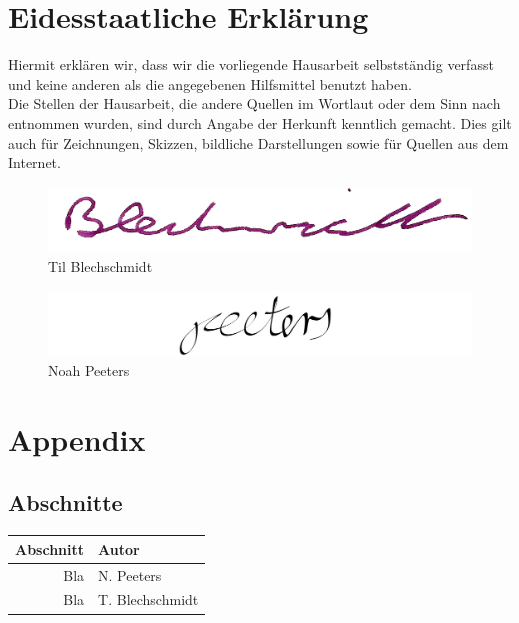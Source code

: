 \documentclass[a4paper]{article}
\begin{document}
    \clearpage
    \section{Eidesstaatliche Erklärung}
        Hiermit erklären wir, dass wir die vorliegende Hausarbeit selbstständig verfasst und keine anderen als die angegebenen Hilfsmittel benutzt haben.\\
        Die Stellen der Hausarbeit, die andere Quellen im Wortlaut oder dem Sinn nach entnommen wurden, sind durch Angabe der Herkunft kenntlich gemacht. Dies gilt auch für Zeichnungen, Skizzen, bildliche Darstellungen sowie für Quellen aus dem Internet.
        
        
        \begin{figure}[H]
            \centering
            \begin{minipage}{.5\textwidth}
                \centering
                \includegraphics[width=\textwidth]{assets/signature_tilb.png}
                Til Blechschmidt
                \label{fig:test1}
            \end{minipage}%
            \begin{minipage}{.5\textwidth}
                \centering
                \includegraphics[width=\textwidth]{assets/signature_noahp.png}
                Noah Peeters
                \label{fig:test2}
            \end{minipage}
        \end{figure}
        \clearpage
    
    \clearpage
    \section{Appendix}
        \printglossary[type=\acronymtype]
        \printglossary
        
        \clearpage
        \nocite{*}
        \printbibliography
        
        \clearpage
        
        \subsection{Abschnitte}
            \begin{tabular}{rl}
              Abschnitt & Autor \\
              \hline
              Bla & N. Peeters\\
              Bla & T. Blechschmidt
            \end{tabular}
        
\end{document}
